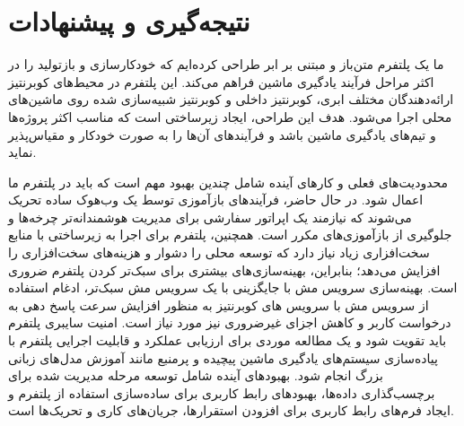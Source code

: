 \chapter{نتیجه‌گیری و پیشنهادات} \label{ch:Conclusion}

ما یک پلتفرم  متن‌باز و مبتنی بر ابر طراحی کرده‌ایم که خودکارسازی و بازتولید را در اکثر مراحل فرآیند یادگیری ماشین فراهم می‌کند. این پلتفرم در محیط‌های کوبرنتیز ارائه‌دهندگان مختلف ابری، کوبرنتیز داخلی و کوبرنتیز شبیه‌سازی شده روی ماشین‌های محلی اجرا می‌شود. هدف این طراحی، ایجاد زیرساختی است که مناسب اکثر پروژه‌ها و تیم‌های یادگیری ماشین باشد و فرآیندهای آن‌ها را به صورت خودکار و مقیاس‌پذیر نماید. 

محدودیت‌های فعلی و کارهای آینده شامل چندین بهبود مهم است که باید در پلتفرم  ما اعمال شود. در حال حاضر، فرآیندهای بازآموزی توسط یک وب‌هوک ساده تحریک می‌شوند که نیازمند یک اپراتور سفارشی برای مدیریت هوشمندانه‌تر چرخه‌ها و جلوگیری از بازآموزی‌های مکرر است. همچنین، پلتفرم برای اجرا به زیرساختی با منابع سخت‌افزاری زیاد نیاز دارد که توسعه محلی را دشوار و هزینه‌های سخت‌افزاری را افزایش می‌دهد؛ بنابراین، بهینه‌سازی‌های بیشتری برای سبک‌تر کردن پلتفرم ضروری است. بهینه‌سازی سرویس مش با جایگزینی  با یک سرویس مش سبک‌تر، ادغام استفاده از سرویس مش با سرویس های کوبرنتیز به منظور افزایش سرعت پاسخ دهی به درخواست کاربر و کاهش اجزای غیرضروری  نیز مورد نیاز است. امنیت سایبری پلتفرم باید تقویت شود و یک مطالعه موردی برای ارزیابی عملکرد و قابلیت اجرایی پلتفرم با پیاده‌سازی سیستم‌های یادگیری ماشین پیچیده و پرمنبع مانند آموزش مدل‌های زبانی بزرگ انجام شود. بهبودهای آینده شامل توسعه مرحله مدیریت شده برای برچسب‌گذاری داده‌ها، بهبودهای رابط کاربری برای ساده‌سازی استفاده از پلتفرم و ایجاد فرم‌های رابط کاربری برای افزودن استقرارها، جریان‌های کاری و تحریک‌ها است.
